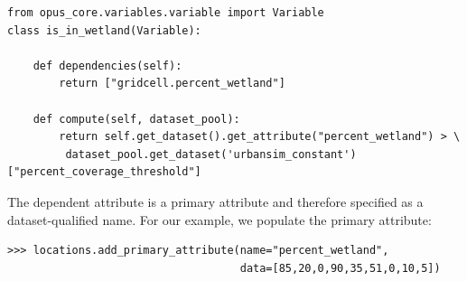\begin{verbatim}
from opus_core.variables.variable import Variable
class is_in_wetland(Variable):

    def dependencies(self):
        return ["gridcell.percent_wetland"]

    def compute(self, dataset_pool):
        return self.get_dataset().get_attribute("percent_wetland") > \
         dataset_pool.get_dataset('urbansim_constant')["percent_coverage_threshold"]

\end{verbatim}
The dependent attribute is a primary attribute and therefore specified as
a dataset-qualified name.  For our example, we populate the primary attribute:
\begin{verbatim}
>>> locations.add_primary_attribute(name="percent_wetland",
                                    data=[85,20,0,90,35,51,0,10,5])
\end{verbatim}

